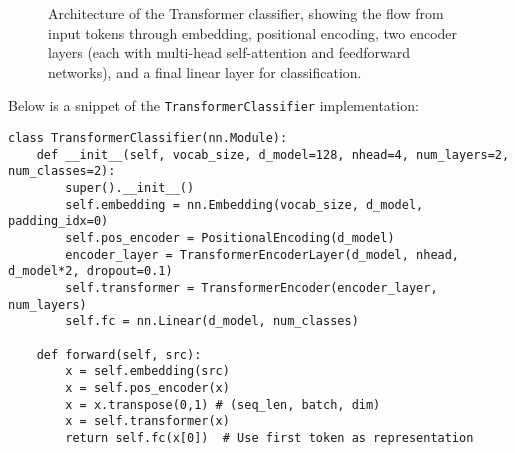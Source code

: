 \documentclass{article}
\begin{document}
\begin{figure}[h]
    \centering
    \caption{Architecture of the Transformer classifier, showing the flow from input tokens through embedding, positional encoding, two encoder layers (each with multi-head self-attention and feedforward networks), and a final linear layer for classification.}
    \label{fig:transformer_arch}
\end{figure}

Below is a snippet of the \texttt{TransformerClassifier} implementation:

\begin{lstlisting}
class TransformerClassifier(nn.Module):
    def __init__(self, vocab_size, d_model=128, nhead=4, num_layers=2, num_classes=2):
        super().__init__()
        self.embedding = nn.Embedding(vocab_size, d_model, padding_idx=0)
        self.pos_encoder = PositionalEncoding(d_model)
        encoder_layer = TransformerEncoderLayer(d_model, nhead, d_model*2, dropout=0.1)
        self.transformer = TransformerEncoder(encoder_layer, num_layers)
        self.fc = nn.Linear(d_model, num_classes)

    def forward(self, src):
        x = self.embedding(src)
        x = self.pos_encoder(x)
        x = x.transpose(0,1) # (seq_len, batch, dim)
        x = self.transformer(x)
        return self.fc(x[0])  # Use first token as representation
\end{lstlisting}
\end{document}
